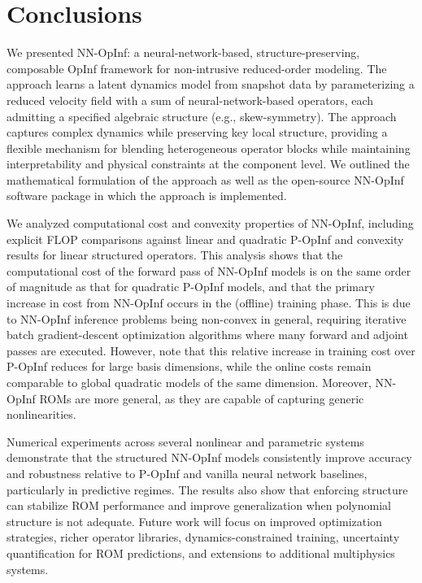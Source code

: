 \documentclass[3p,computermodern,11pt]{elsarticle}
\numberwithin{equation}{section}
\newcommand{\code}[1]{{\ttfamily\color{black} #1}}
\begin{document}
\section{Conclusions}\label{sec:conclusions}
We presented NN-OpInf: a neural-network-based, structure-preserving, composable OpInf framework for non-intrusive reduced-order modeling. The approach learns a latent dynamics model from snapshot data by parameterizing a reduced velocity field with a sum of neural-network-based operators, each admitting a specified algebraic structure (e.g., skew-symmetry). The approach captures complex dynamics while preserving key local structure, providing a flexible mechanism for blending heterogeneous operator blocks while maintaining interpretability and physical constraints at the component level. We outlined the mathematical formulation of the approach as well as the open-source \code{NN-OpInf} software package in which the approach is implemented. 

We analyzed computational cost and convexity properties of NN-OpInf, including explicit FLOP comparisons against linear and quadratic P-OpInf and convexity results for linear structured operators. This analysis shows that the computational cost of the forward pass of NN-OpInf models is on the same order of magnitude as that for quadratic P-OpInf models, and that the primary increase in cost from NN-OpInf occurs in the (offline) training phase.  
This is due to NN-OpInf inference problems being non-convex in general, requiring iterative batch gradient-descent optimization algorithms where many forward and adjoint passes are executed.  However, note that this relative increase in training cost over P-OpInf reduces for large basis dimensions, while the online costs remain comparable to global quadratic models of the same dimension.  Moreover, NN-OpInf ROMs are more general, as they are capable of capturing generic nonlinearities.


Numerical experiments across several nonlinear and parametric systems demonstrate that the structured NN-OpInf models consistently improve accuracy and robustness relative to P-OpInf and vanilla neural network baselines, particularly in predictive regimes. The results also show that enforcing structure can stabilize ROM performance and improve generalization when polynomial structure is not adequate. Future work will focus on improved optimization strategies, richer operator libraries, dynamics-constrained training, uncertainty quantification for ROM predictions, and extensions to additional multiphysics systems.
\end{document}
